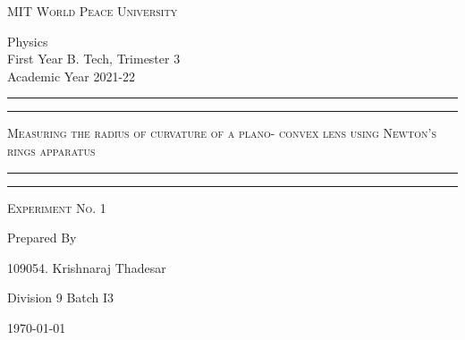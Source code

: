 \documentclass[11pt]{article}
\begin{document}
	
	\begin{titlepage} 
		\centering 
		
		
		\huge\textsc{
			MIT World Peace University
		}\\
	
		\vspace{0.75\baselineskip} %
		
		\LARGE{
			Physics\\
			First Year B. Tech, Trimester 3\\
			Academic Year 2021-22
		}
		
		\vfill %
		
		
		\rule{\textwidth}{1.6pt}\vspace*{-\baselineskip}\vspace*{2pt}
		\rule{\textwidth}{0.6pt}
		\vspace{0.75\baselineskip} %
		
		
		
		\huge{\textsc{
				Measuring the radius of curvature of a plano-
				convex lens using Newton’s rings apparatus
			}} \\
		
		
		
		\vspace{0.5\baselineskip} %
		\rule{\textwidth}{0.6pt}\vspace*{-\baselineskip}\vspace*{2.8pt}
		\rule{\textwidth}{1.6pt}
		
		\vspace{1\baselineskip} %

			
		\LARGE\textsc{
			Experiment No. 1
		} %
		\vfill
		
		
		Prepared By
		\vspace{0.5\baselineskip} %
		
		\Large{
			109054. Krishnaraj Thadesar
			
			Division 9 Batch I3
		}
		
		
		\vspace{0.5\baselineskip} %
		\today

	\end{titlepage}
\end{document}
